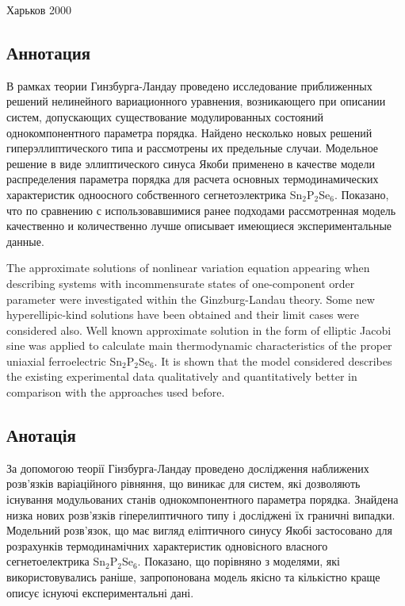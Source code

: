 \begin{center}
  Харьков 2000
\end{center}
\subsection{Аннотация}
В рамках теории Гинзбурга-Ландау проведено исследование приближенных решений нелинейного вариационного уравнения, возникающего при описании систем, допускающих существование модулированных состояний однокомпонентного параметра порядка.
Найдено несколько новых решений гиперэллиптического типа и рассмотрены их предельные случаи.
Модельное решение в виде эллиптического синуса Якоби применено в качестве модели распределения параметра порядка для расчета основных термодинамических характеристик одноосного собственного сегнетоэлектрика Sn$_2$P$_2$Se$_6$.
Показано, что по сравнению с использовавшимися ранее подходами рассмотренная модель качественно и количественно лучше описывает имеющиеся экспериментальные данные.

The approximate solutions of nonlinear variation equation appearing when describing systems with incommensurate states of one-component order parameter were investigated within the Ginzburg-Landau theory.
Some new hyperellipic-kind solutions have been obtained and their limit cases were considered also.
Well known approximate solution in the form of elliptic Jacobi sine was applied to calculate main thermodynamic characteristics of the proper uniaxial ferroelectric Sn$_2$P$_2$Se$_6$.
It is shown that the model considered describes the existing experimental data qualitatively and quantitatively better in comparison with the approaches used before. 

\subsection{Анотація}
За допомогою теорії Гінзбурга-Ландау проведено дослідження наближених розв’язків варіаційного рівняння, що виникає для систем, які дозволяють існування модульованих станів однокомпонентного параметра порядка.
Знайдена низка нових розв’язків гіперелиптичного типу і досліджені їх граничні випадки.
Модельний розв’язок, що має вигляд еліптичного синусу Якобі застосовано для розрахунків термодинамічних характеристик одновісного власного сегнетоелектрика Sn$_2$P$_2$Se$_6$.
Показано, що порівняно з моделями, які використовувались раніше, запропонована модель якісно та кількістно краще описує існуючі експериментальні дані.
